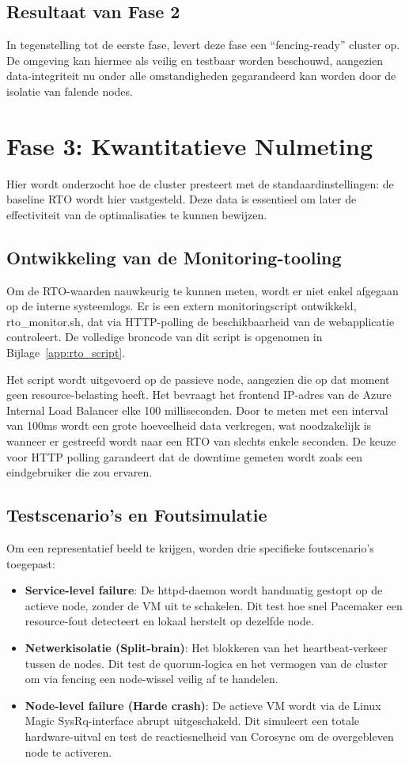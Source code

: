 \subsection{Resultaat van Fase 2}
In tegenstelling tot de eerste fase, levert deze fase een “fencing-ready” cluster op. De omgeving kan hiermee als veilig en testbaar worden beschouwd, aangezien data-integriteit nu onder alle omstandigheden gegarandeerd kan worden door de isolatie van falende nodes.

\section{Fase 3: Kwantitatieve Nulmeting}
Hier wordt onderzocht hoe de cluster presteert met de standaardinstellingen: de baseline RTO wordt hier vastgesteld. Deze data is essentieel om later de effectiviteit van de optimalisaties te kunnen bewijzen. 

\subsection{Ontwikkeling van de Monitoring-tooling}
Om de RTO-waarden nauwkeurig te kunnen meten, wordt er niet enkel afgegaan op de interne systeemlogs. Er is een extern monitoringscript ontwikkeld, rto\_monitor.sh, dat via HTTP-polling de beschikbaarheid van de webapplicatie controleert. De volledige broncode van dit script is opgenomen in Bijlage~\ref{app:rto_script}.
\medskip

Het script wordt uitgevoerd op de passieve node, aangezien die op dat moment geen resource-belasting heeft. Het bevraagt het frontend IP-adres van de Azure Internal Load Balancer elke 100 milliseconden. Door te meten met een interval van 100ms wordt een grote hoeveelheid data verkregen, wat noodzakelijk is wanneer er gestreefd wordt naar een RTO van slechts enkele seconden. De keuze voor HTTP polling garandeert dat de downtime gemeten wordt zoals een eindgebruiker die zou ervaren.

\subsection{Testscenario's en Foutsimulatie}
Om een representatief beeld te krijgen, worden drie specifieke foutscenario's toegepast:

\begin{itemize}
    \item \textbf{Service-level failure}: De httpd-daemon wordt handmatig gestopt op de actieve node, zonder de VM uit te schakelen. Dit test hoe snel Pacemaker een resource-fout detecteert en lokaal herstelt op dezelfde node.
    \item \textbf{Netwerkisolatie (Split-brain)}: Het blokkeren van het heartbeat-verkeer tussen de nodes. Dit test de quorum-logica en het vermogen van de cluster om via fencing een node-wissel veilig af te handelen.
    \item \textbf{Node-level failure (Harde crash)}: De actieve VM wordt via de Linux Magic SysRq-interface abrupt uitgeschakeld. Dit simuleert een totale hardware-uitval en test de reactiesnelheid van Corosync om de overgebleven node te activeren.
\end{itemize}

